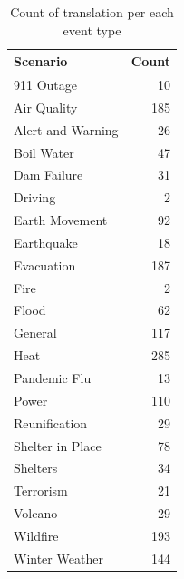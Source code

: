 \begin{table}
\centering
\begin{tabular}{lr}
\toprule
\textbf{Scenario} & \textbf{Count} \\
\midrule
911 Outage & 10 \\
Air Quality & 185 \\
Alert and Warning & 26 \\
Boil Water & 47 \\
Dam Failure & 31 \\
Driving & 2 \\
Earth Movement & 92 \\
Earthquake & 18 \\
Evacuation & 187 \\
Fire & 2 \\
Flood & 62 \\
General & 117 \\
Heat & 285 \\
Pandemic Flu & 13 \\
Power & 110 \\
Reunification & 29 \\
Shelter in Place & 78 \\
Shelters & 34 \\
Terrorism & 21 \\
Volcano & 29 \\
Wildfire & 193 \\
Winter Weather & 144 \\
\bottomrule
\end{tabular}
\caption{Count of translation per each event type}
\label{tab:domain_counts_combined}

\end{table}